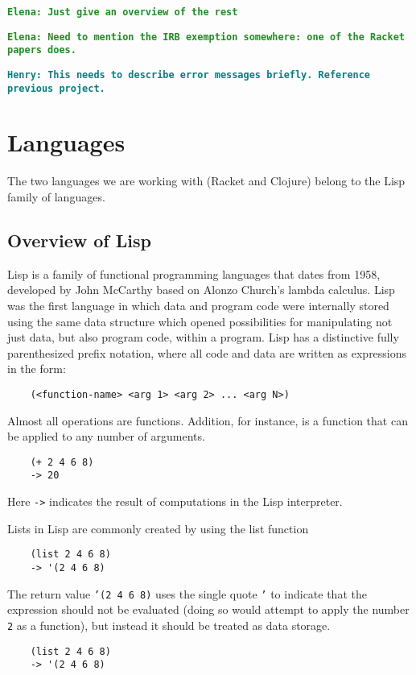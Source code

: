 \documentclass[12pt]{article}
\newcommand{\comment}[1]{{\bf \tt  {#1}}}
\newcommand{\emcomment}[1]{\textcolor{ForestGreen}{\comment{Elena: {#1}}}}
\newcommand{\hfcomment}[1]{\textcolor{Teal}{\comment{Henry: {#1}}}}
\begin{document}
\emcomment{Just give an overview of the rest}

\emcomment{Need to mention the IRB exemption somewhere: one of the Racket papers does.}


	\hfcomment{This needs to describe error messages briefly. Reference previous project.}
\section{Languages}\label{sec:lang}
The two languages we are working with (Racket and Clojure) belong to the Lisp family of languages. 

	\subsection{Overview of Lisp}\label{sec:lisp}

	Lisp is a family of functional programming languages that dates from 1958, developed by John McCarthy based on Alonzo Church's lambda calculus.
	Lisp was the first language in which data and program code were internally stored using the same data structure which opened possibilities for manipulating not just data, but also program code, within a program.
	Lisp has a distinctive fully parenthesized prefix notation, where all code and data are written as expressions in the form:
	\begin{verbatim}
	(<function-name> <arg 1> <arg 2> ... <arg N>)
	\end{verbatim}
Almost all operations are functions. Addition, for instance, is a function that can be applied to any number of arguments.
	\begin{verbatim}
	(+ 2 4 6 8)
	-> 20
	\end{verbatim}
Here \texttt{->} indicates the result of computations in the Lisp interpreter. 

Lists in Lisp are commonly created by using the list function
 	\begin{verbatim}
	(list 2 4 6 8)
	-> '(2 4 6 8)
	\end{verbatim}
The return value \texttt{'(2 4 6 8)} uses the single quote \texttt{'} to indicate that the expression should not be evaluated (doing so would attempt to apply the number \texttt{2} as a function), but instead it should be treated as data storage. 
	\begin{verbatim}
	(list 2 4 6 8)
	-> '(2 4 6 8)
	\end{verbatim}
	
\end{document}
